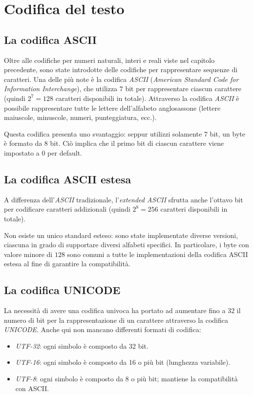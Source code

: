 



\chapter{Codifica del testo}
\section{La codifica ASCII}
Oltre alle codifiche per numeri naturali, interi e reali viste nel capitolo precedente, sono state introdotte delle codifiche per rappresentare sequenze di caratteri. Una delle più note è la codifica \emph{ASCII} (\emph{American Standard Code for Information Interchange}), che utilizza \(7\) bit per rappresentare ciascun carattere (quindi \(2^7=128\) caratteri disponibili in totale).
Attraverso la codifica \emph{ASCII} è possibile rappresentare tutte le lettere dell'alfabeto anglosassone (lettere maiuscole, minuscole, numeri, punteggiatura, ecc.).

Questa codifica presenta uno svantaggio: seppur utilizzi solamente 7 bit, un byte è formato da 8 bit. Ciò implica che il primo bit di ciascun carattere viene impostato a 0 per default.

\section{La codifica ASCII estesa}
A differenza dell'\emph{ASCII} tradizionale, l'\emph{extended ASCII} sfrutta anche l'ottavo bit per codificare caratteri addizionali (quindi \(2^8=256\) caratteri disponibili in totale).

Non esiste un unico standard esteso: sono state implementate diverse versioni, ciascuna in grado di supportare diversi alfabeti specifici. In particolare, i byte con valore minore di \(128\) sono comuni a tutte le implementazioni della codifica ASCII estesa al fine di garantire la compatibilità.

\section{La codifica UNICODE}
La necessità di avere una codifica univoca ha portato ad aumentare fino a \(32\) il numero di bit per la rappresentazione di un carattere attraverso la codifica \emph{UNICODE}. Anche qui non mancano differenti formati di codifica:
\begin{itemize}[noitemsep]
	\item \emph{UTF-32}: ogni simbolo è composto da 32 bit.
	\item \emph{UTF-16}: ogni simbolo è composto da 16 o più bit (lunghezza variabile).
	\item \emph{UTF-8}: ogni simbolo è composto da 8 o più bit; mantiene la compatibilità con ASCII.
\end{itemize}

